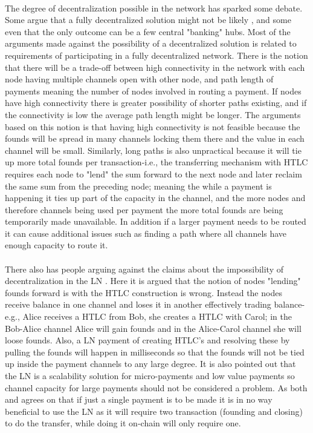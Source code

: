 \documentclass[informationsecurity]{gucmasterproject}
\begin{document}
\paragraph{}
The degree of decentralization possible in the network has sparked some debate. Some argue that a fully decentralized solution might not be likely \cite{sceptic1}, and some even that the only outcome can be a few central "banking" hubs\cite{sceptic2}. Most of the arguments made against the possibility of a decentralized solution is related to requirements of participating in a fully decentralized network. There is the notion that there will be a trade-off between high connectivity in the network with each node having multiple channels open with other node, and path length of payments meaning the number of nodes involved in routing a payment. If nodes have high connectivity there is greater possibility of shorter paths existing, and if the connectivity is low the average path length might be longer.
The arguments based on this notion is  that having high connectivity is not feasible because the founds will be spread in many channels locking them there and the value in each channel will be small. Similarly, long paths is also unpractical because it will tie up more total founds per transaction-i.e., the transferring mechanism with HTLC requires each node to "lend" the sum forward to the next node and later reclaim the same sum from the preceding node; meaning the while a payment is happening it ties up part of the capacity in the channel, and the more nodes and therefore channels being used per payment the more total founds are being temporarily made unavailable.
In addition if a larger payment needs to be routed it can cause additional issues such as finding a path where all channels have enough capacity to route it.

\paragraph{}
There also has people arguing against the claims about the impossibility of decentralization in the LN \cite{answer1}\cite{answer2}.
Here it is argued that the notion of nodes "lending" founds forward is with the HTLC construction is wrong.
Instead the nodes receive balance in one channel and loses it in another effectively trading balance-e.g., Alice receives a HTLC from Bob, she creates a HTLC with Carol; in the Bob-Alice channel Alice will gain founds and in the Alice-Carol channel she will loose founds.
Also, a LN payment of creating HTLC's and resolving these by pulling the founds will happen in milliseconds so that the founds will not be tied up inside the payment channels to any large degree. It is also pointed out that the LN is a scalability solution for micro-payments and low value payments so channel capacity for large payments should not be considered a problem. As both \cite{sceptic2} and \cite{answer1} agrees on that if just a single payment is to be made it is in no way beneficial to use the LN as it will require two transaction (founding and closing) to do the transfer, while doing it on-chain will only require one.
\end{document}
